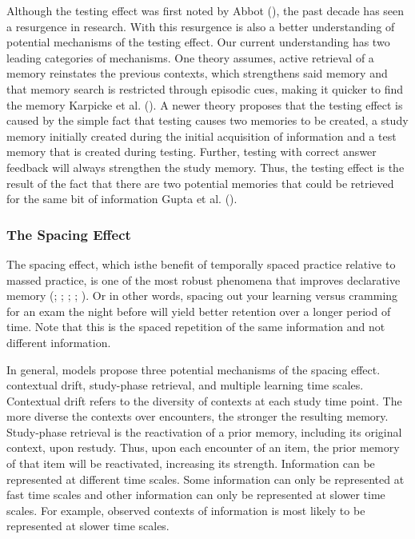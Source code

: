 \documentclass[
]{krantz}
\begin{document}
Although the testing effect was first noted by Abbot (), the past decade has seen a resurgence in research. With this resurgence is also a better understanding of potential mechanisms of the testing effect. Our current understanding has two leading categories of mechanisms. One theory assumes, active retrieval of a memory reinstates the previous contexts, which strengthens said memory and that memory search is restricted through episodic cues, making it quicker to find the memory Karpicke et al. (). A newer theory proposes that the testing effect is caused by the simple fact that testing causes two memories to be created, a study memory initially created during the initial acquisition of information and a test memory that is created during testing. Further, testing with correct answer feedback will always strengthen the study memory. Thus, the testing effect is the result of the fact that there are two potential memories that could be retrieved for the same bit of information Gupta et al. ().

\subsubsection*{The Spacing Effect}\label{the-spacing-effect}


The spacing effect, which isthe benefit of temporally spaced practice relative to massed practice, is one of the most robust phenomena that improves declarative memory (; ; ; ; ). Or in other words, spacing out your learning versus cramming for an exam the night before will yield better retention over a longer period of time. Note that this is the spaced repetition of the same information and not different information.

In general, models propose three potential mechanisms of the spacing effect. contextual drift, study-phase retrieval, and multiple learning time scales. Contextual drift refers to the diversity of contexts at each study time point. The more diverse the contexts over encounters, the stronger the resulting memory. Study-phase retrieval is the reactivation of a prior memory, including its original context, upon restudy. Thus, upon each encounter of an item, the prior memory of that item will be reactivated, increasing its strength. Information can be represented at different time scales. Some information can only be represented at fast time scales and other information can only be represented at slower time scales. For example, observed contexts of information is most likely to be represented at slower time scales.
\end{document}
